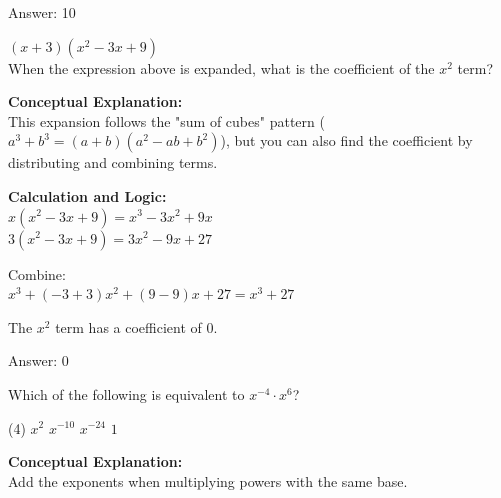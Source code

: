 \documentclass[11pt,paper=a4,answers]{exam}
\begin{document}
\begin{questions}
\begin{solution}
\vspace{25pt}

Answer: \colorbox{yellow!100}{10}
\end{solution}

\vspace{40pt}

\question
$(x + 3)(x^2 - 3x + 9)$ \\
When the expression above is expanded, what is the coefficient of the $x^2$ term?

\begin{solution}
\textbf{Conceptual Explanation:} \\
This expansion follows the "sum of cubes" pattern ($a^3 + b^3 = (a + b)(a^2 - ab + b^2)$), but you can also find the coefficient by distributing and combining terms.

\vspace{20pt}

\textbf{Calculation and Logic:} \\
$x(x^2 - 3x + 9) = x^3 - 3x^2 + 9x$ \\
$3(x^2 - 3x + 9) = 3x^2 - 9x + 27$

\vspace{10pt}

Combine: \\
$x^3 + (-3 + 3)x^2 + (9 - 9)x + 27 = x^3 + 27$

\vspace{10pt}

The $x^2$ term has a coefficient of 0.

\vspace{25pt}

Answer: \colorbox{yellow!100}{0}
\end{solution}

\vspace{40pt}

\question
Which of the following is equivalent to $x^{-4} \cdot x^6$?
\begin{tasks}(4)
    \task $x^2$
    \task $x^{-10}$
    \task $x^{-24}$
    \task $1$
\end{tasks}

\begin{solution}
\textbf{Conceptual Explanation:} \\
Add the exponents when multiplying powers with the same base.


\end{solution}
\end{questions}
\end{document}

